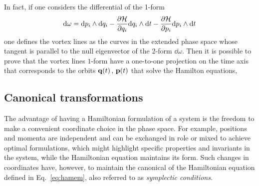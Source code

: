 In fact, if one considers the differential of the 1-form
\begin{equation}
    \dd\omega= \dd p_i\wedge \dd q_i-\pdv{\mathcal{H}}{q_i}\dd q_i \wedge \dd t-\pdv{\mathcal{H}}{p_i} \dd p_i \wedge \dd t
    \label{dome}
\end{equation}
one defines the vortex lines as the curves in the extended phase space whose tangent is parallel to the null eigenvector of the 2-form $\dd\omega$. Then it is possible to prove that the vortex lines $1$-form have a one-to-one projection on the time axis that corresponds to the orbits $\vb{q}(t)\, , \, \vb{p}(t)$ that solve the Hamilton equations, 

\begin{comment}
is described by the motion of a particle in the time interval $[t_0,\,t_1]$ yields
\begin{equation}
    \int_{q_0=q(t_0)}^{q_1=q(t_1)} \qty(p_i \dd q_i - \ham \dd t) = \int_{t_0}^{t_1} \qty(p_i \dv{q_i}{t} - \ham)\dd t =  \int_{t_0}^{t_1} \mathcal{L} \dd t\,, 
\end{equation}
where $\mathcal{L}=p_i\dot q_i - \ham$ is the Lagrangian, obtained by the Legendre transformation of the Hamiltonian. 
\end{comment}
\subsection{Canonical transformations}

The advantage of having a Hamiltonian formulation of a system is the freedom to make a convenient coordinate choice in the phase space. For example, positions and momenta are independent and can be exchanged in role or mixed to achieve optimal formulations, which might highlight specific properties and invariants in the system, while the Hamiltonian equation maintains its form. Such changes in coordinates have, however, to maintain the canonical of the Hamiltonian equation defined in Eq.~\eqref{eq:hamem}, also referred to as \textit{symplectic conditions}.

